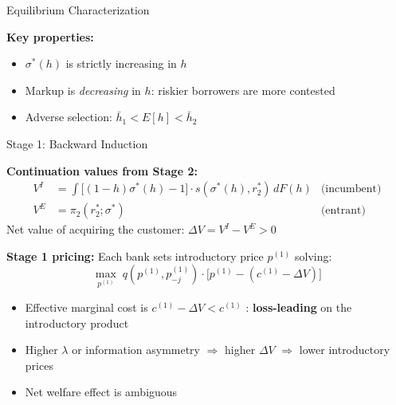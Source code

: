 \documentclass[10pt,aspectratio=169]{beamer}
\begin{document}
\begin{frame}{Equilibrium Characterization}


\vspace{0.3cm}
\textbf{Key properties:}
\begin{itemize}
    \item $\sigma^*(h)$ is strictly increasing in $h$ 
    \item Markup is \emph{decreasing} in $h$: riskier borrowers are more contested
    \item Adverse selection: $\bar{h}_1 < E[h] < \bar{h}_2$ 
\end{itemize}

\end{frame}


\begin{frame}{Stage 1: Backward Induction}

\textbf{Continuation values from Stage 2:}
\begin{align*}
    V^I &= \int \big[(1-h)\sigma^*(h) - 1\big] \cdot s(\sigma^*(h), r_2^*) \, dF(h) & \text{(incumbent)} \\
    V^E &= \pi_2(r_2^*; \sigma^*) & \text{(entrant)}
\end{align*}
Net value of acquiring the customer: $\Delta V = V^I - V^E > 0$

\vspace{0.3cm}
\textbf{Stage 1 pricing:} Each bank sets introductory price $p^{(1)}$ solving:
$$\max_{p^{(1)}} \; q(p^{(1)}, p^{(1)}_{-j}) \cdot \big[p^{(1)} - (c^{(1)} - \Delta V)\big]$$
\begin{itemize}
    \item Effective marginal cost is $c^{(1)} - \Delta V < c^{(1)}$ : \textbf{loss-leading} on the introductory product
    \item Higher $\lambda$ or information asymmetry $\Rightarrow$ higher $\Delta V$ $\Rightarrow$ lower introductory prices
    \item Net welfare effect is ambiguous
\end{itemize}

\end{frame}
\end{document}
